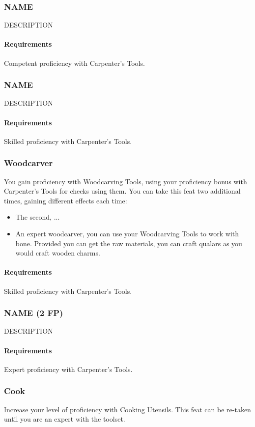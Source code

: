 \subsubsection{NAME} \label{feat::name}
    DESCRIPTION
    \paragraph{Requirements} Competent proficiency with Carpenter's Tools.
\subsubsection{NAME} \label{feat::name}
    DESCRIPTION
    \paragraph{Requirements} Skilled proficiency with Carpenter's Tools.
\subsubsection{Woodcarver} \label{feat::woodcarver}
    You gain proficiency with Woodcarving Tools, using your proficiency bonus with Carpenter's Tools for checks using them.
    You can take this feat two additional times, gaining different effects each time:
    \begin{itemize}
        \item The second, ...
        \item An expert woodcarver, you can use your Woodcarving Tools to work with bone.
        Provided you can get the raw materials, you can craft qualars as you would craft wooden charms.
    \end{itemize}
    \paragraph{Requirements} Skilled proficiency with Carpenter's Tools.
\subsubsection{NAME (2 FP)} \label{feat::name}
    DESCRIPTION
    \paragraph{Requirements} Expert proficiency with Carpenter's Tools.
\subsubsection{Cook} \label{feat::cook}
    Increase your level of proficiency with Cooking Utensils.
    This feat can be re-taken until you are an expert with the toolset.
